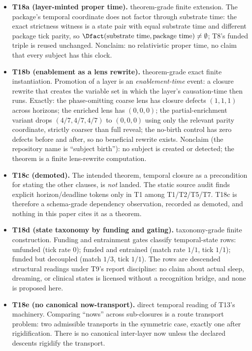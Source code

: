 \begin{itemize}
\item \textbf{T18a (layer-minted proper time).} \gradeS{} theorem-grade finite
extension. The package's temporal coordinate does not factor through
substrate time: the exact strictness witness is a state pair with equal
substrate time and different package tick parity, so
$\Dfact(\text{substrate time}, \text{package time}) \neq \emptyset$; T8's
funded triple is reused unchanged. Nonclaim: no relativistic proper time, no
claim that every subject has this clock.
\item \textbf{T18b (enablement as a lens rewrite).} \gradeS{} theorem-grade
exact finite instantiation. Promotion of a layer is an \emph{enablement-time}
event: a closure rewrite that creates the variable set in which the layer's
causation-time then runs. Exactly: the phase-omitting coarse lens has closure
defects $(1,1,1)$ across horizons; the enriched lens has $(0,0,0)$; the
partial-enrichment variant drops $(4/7,4/7,4/7)$ to $(0,0,0)$ using only the
relevant parity coordinate, strictly coarser than full reveal; the no-birth
control has zero defects before and after, so no beneficial rewrite exists.
Nonclaim (the repository name is ``subject birth''): no subject is created or
detected; the theorem is a finite lens-rewrite computation.
\item \textbf{T18c (demoted).} The intended theorem, temporal closure as a
precondition for stating the other clauses, is \emph{not} landed. The
static source audit finds explicit horizon/deadline tokens only in T1 among
T1/T2/T5/T7. T18c is therefore a schema-grade dependency observation,
recorded as demoted, and nothing in this paper cites it as a theorem.
\item \textbf{T18d (state taxonomy by funding and gating).} \gradeS{}
taxonomy-grade finite construction. Funding and entrainment gates classify
temporal-state rows: unfunded (tick rate $0$); funded and entrained (match
rate $1/1$, tick $1/1$); funded but decoupled (match $1/3$, tick $1/1$). The
rows are descended structural readings under T9's report discipline:
no claim about actual sleep, dreaming, or clinical states is licensed without
a recognition bridge, and none is proposed here.
\item \textbf{T18e (no canonical now-transport).} \gradeS{} direct temporal
reading of T13's machinery. Comparing ``nows'' across sub-closures is a route
transport problem: two admissible transports in the symmetric case, exactly
one after rigidification. There is no canonical inter-layer now unless the
declared descents rigidify the transport.
\end{itemize}

